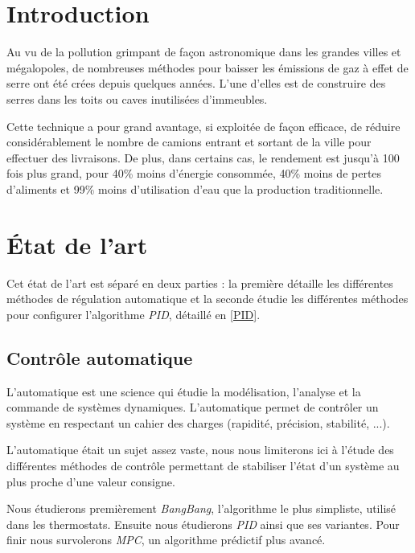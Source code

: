 \documentclass[a4paper,10pt]{report}
\begin{document}
\tableofcontents


\chapter{Introduction}

Au vu de la pollution grimpant de façon astronomique dans les grandes villes et mégalopoles, de nombreuses méthodes pour baisser les émissions de gaz à effet de serre ont été crées depuis quelques années. L'une d'elles est de construire des serres dans les toits ou caves inutilisées d'immeubles.

Cette technique a pour grand avantage, si exploitée de façon efficace, de réduire considérablement le nombre de camions entrant et sortant de la ville pour effectuer des livraisons. De plus, dans certains cas, le rendement est jusqu'à 100 fois plus grand, pour 40\% moins d'énergie consommée, 40\% moins de pertes d'aliments et 99\% moins d'utilisation d'eau que la production traditionnelle.




\chapter{État de l'art}

Cet état de l'art est séparé en deux parties : la première détaille les différentes méthodes de régulation automatique et la seconde étudie les différentes méthodes pour configurer l'algorithme \emph{PID}, détaillé en \ref{PID}.

\section{Contrôle automatique}
L’automatique est une science qui étudie la modélisation, l’analyse et la commande de systèmes dynamiques.
L’automatique permet de contrôler un système en respectant un cahier des charges (rapidité, précision, stabilité, ...).

L'automatique était un sujet assez vaste, nous nous limiterons ici à l'étude des différentes méthodes de contrôle permettant de stabiliser l'état d'un système au plus proche d'une valeur consigne.

Nous étudierons premièrement \emph{BangBang}, l'algorithme le plus simpliste, utilisé dans les thermostats.
Ensuite nous étudierons \emph{PID} ainsi que ses variantes.
Pour finir nous survolerons \emph{MPC}, un algorithme prédictif plus avancé.
\end{document}
